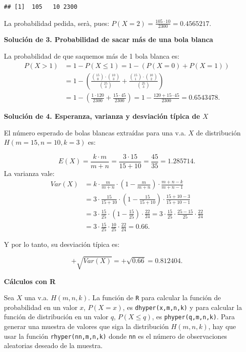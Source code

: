 \documentclass[]{book}
\begin{document}
\begin{verbatim}
## [1]  105   10 2300
\end{verbatim}

La probabilidad pedida, serà, pues:
\(P(X=2)=\frac{105\cdot10 }{2300}=0.4565217.\)

\textbf{Solución de 3. Probabilidad de sacar más de una bola blanca}

La probabilidad de que saquemos más de 1 bola blanca es:
\[
\begin{array}{rl}
P(X> 1)&= 1-P(X\leq 1)=1-(P(X=0)+P(X=1))\\
&=
1-\left(\frac{\binom{15}{0}\cdot \binom{10}{3}}{\binom{25}{3}}+
\frac{\binom{15}{1}\cdot \binom{10}{2}}{\binom{25}{3}}\right)\\
&=
1-\left(
\frac{1\cdot120 }{2300}+\frac{15\cdot45 }{2300}
\right)=1-\frac{120+15\cdot 45}{2300}=0.6543478.
\end{array}
\]

\textbf{Solución de 4. Esperanza, varianza y desviación típica de \(X\)}

El número esperado de bolas blancas extraídas para una v.a. \(X\) de distribución \(H(m=15,n=10,k=3)\) es:

\[E(X)=\frac{k\cdot m}{m+n}=\frac{3\cdot 15}{15+10}=\frac{45}{35}=1.285714.\]
La varianza vale:
\[
\begin{array}{rl}
Var(X)&=k\cdot\frac{m}{m+n}\cdot\left(1-\frac{m}{m+n}\right) \cdot\frac{m+n-k}{m+n-1}\\
&=3\cdot\frac{15}{15+10}\cdot\left(1-\frac{15}{15+10}\right) \cdot\frac{15+10-3}{15+10-1}\\
&=
3\cdot\frac{15}{25}\cdot\left(1-\frac{15}{25}\right) \cdot\frac{22}{24}= 
3\cdot\frac{15}{25}\cdot\frac{25-15}{25} \cdot\frac{22}{24}\\
&=
3\cdot\frac{15}{25}\cdot\frac{10}{25}\cdot\frac{22}{24}=0.66.
\end{array}
\]

Y por lo tanto, su desviación típica es:

\[
+\sqrt{Var(X)}=+\sqrt{0.66}=0.812404.
\]

\textbf{Cálculos con R}

Sea \(X\) una v.a. \(H(m,n,k)\). La función de \texttt{R} para calcular la función de probabilidad en un valor \(x\), \(P(X=x)\), es \texttt{dhyper(x,m,n,k)} y para calcular la función de distribución en un valor \(q\), \(P(X\leq q)\), es \texttt{phyper(q,m,n,k)}. Para generar una muestra de valores que siga la distribución \(H(m,n,k)\), hay que usar la función \texttt{rhyper(nn,m,n,k)} donde \texttt{nn} es el número de observaciones aleatorias deseado de la muestra.
\end{document}
